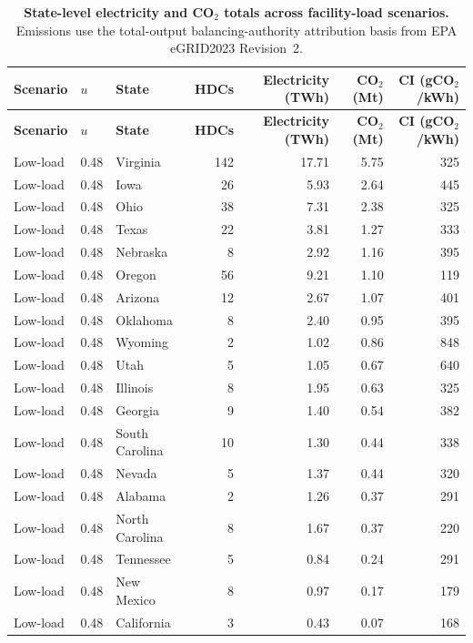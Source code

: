 \documentclass[12pt]{article}
\begin{document}
\begin{landscape}
\scriptsize
\begin{longtable}{ll l r r r r}
\caption{\textbf{State-level electricity and CO$_2$ totals across facility-load scenarios.} Emissions use the total-output balancing-authority attribution basis from EPA eGRID2023 Revision~2.}\label{tab:state_scenarios_round3}\\
\toprule
\textbf{Scenario} & \textbf{$u$} & \textbf{State} & \textbf{HDCs} & \textbf{Electricity (TWh)} & \textbf{CO$_2$ (Mt)} & \textbf{CI (gCO$_2$/kWh)} \\
\midrule
\endfirsthead
\toprule
\textbf{Scenario} & \textbf{$u$} & \textbf{State} & \textbf{HDCs} & \textbf{Electricity (TWh)} & \textbf{CO$_2$ (Mt)} & \textbf{CI (gCO$_2$/kWh)} \\
\midrule
\endhead
Low-load & 0.48 & Virginia & 142 & 17.71 & 5.75 & 325 \\
Low-load & 0.48 & Iowa & 26 & 5.93 & 2.64 & 445 \\
Low-load & 0.48 & Ohio & 38 & 7.31 & 2.38 & 325 \\
Low-load & 0.48 & Texas & 22 & 3.81 & 1.27 & 333 \\
Low-load & 0.48 & Nebraska & 8 & 2.92 & 1.16 & 395 \\
Low-load & 0.48 & Oregon & 56 & 9.21 & 1.10 & 119 \\
Low-load & 0.48 & Arizona & 12 & 2.67 & 1.07 & 401 \\
Low-load & 0.48 & Oklahoma & 8 & 2.40 & 0.95 & 395 \\
Low-load & 0.48 & Wyoming & 2 & 1.02 & 0.86 & 848 \\
Low-load & 0.48 & Utah & 5 & 1.05 & 0.67 & 640 \\
Low-load & 0.48 & Illinois & 8 & 1.95 & 0.63 & 325 \\
Low-load & 0.48 & Georgia & 9 & 1.40 & 0.54 & 382 \\
Low-load & 0.48 & South Carolina & 10 & 1.30 & 0.44 & 338 \\
Low-load & 0.48 & Nevada & 5 & 1.37 & 0.44 & 320 \\
Low-load & 0.48 & Alabama & 2 & 1.26 & 0.37 & 291 \\
Low-load & 0.48 & North Carolina & 8 & 1.67 & 0.37 & 220 \\
Low-load & 0.48 & Tennessee & 5 & 0.84 & 0.24 & 291 \\
Low-load & 0.48 & New Mexico & 8 & 0.97 & 0.17 & 179 \\
Low-load & 0.48 & California & 3 & 0.43 & 0.07 & 168 \\

\end{longtable}
\end{landscape}
\end{document}
